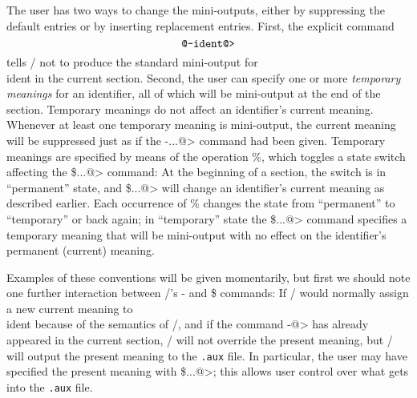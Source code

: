 The user has two ways to change the mini-outputs, either by suppressing
the default entries or by inserting replacement entries. First, the explicit
command
$$\hbox{\tt@-\*{ident}@>}$$
tells \CTWILL/ not to produce the standard mini-output for \\{ident} in the
current section. Second, the user can specify one or more {\em temporary
meanings\/} for an identifier, all of which will be mini-output at the end
of the section. Temporary meanings do not affect an identifier's current
meaning. Whenever at least one temporary meaning is mini-output, the
current meaning will be suppressed just as if the {\tt@-...@>} command had
been given. Temporary meanings are specified by means of the operation
{\tt@\%}, which toggles a state switch affecting the {\tt@\$...@>} command:
At the beginning of a section, the switch is in ``permanent'' state, and
{\tt@\$...@>} will change an identifier's current meaning as described
earlier. Each occurrence of {\tt@\%} changes the state from ``permanent''
to ``temporary'' or back again; in ``temporary'' state the {\tt@\$...@>}
command specifies a temporary meaning that will be mini-output with no
effect on the identifier's permanent (current) meaning.

Examples of these conventions will be given momentarily, but first we
should note one further interaction between \CTWILL/'s {\tt@-} and {\tt@\$}
commands: If \CTWILL/ would normally assign a new current meaning to
\\{ident} because of the semantics of \CEE/, and if the command
{\tt@-@>} has already appeared in the current
section, \CTWILL/ will not
override the present meaning, but \CTWILL/ will output the present meaning
to the {\tt.aux} file. In particular, the user may have specified the present
meaning with {\tt@\$...@>}; this allows user control over what gets
into the {\tt.aux} file.

